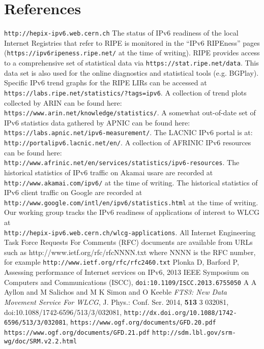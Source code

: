 \section*{References}

\begin{thebibliography}{1}
 {\tt http://hepix-ipv6.web.cern.ch}
 The status of IPv6 readiness of the local Internet Registries
that refer to RIPE is monitored in the ``IPv6 RIPEness'' pages ({\tt https://ipv6ripeness.ripe.net/} at the time of writing). 
 RIPE provides access to a comprehensive set of statistical
data via {\tt https://stat.ripe.net/data}. This data set is also used for
the online diagnostics and statistical tools (e.g. BGPlay). 
 Specific
IPv6 trend graphs for the RIPE LIRs can be accessed at\\ {\tt https://labs.ripe.net/statistics/?tags=ipv6}.
 A collection of trend plots collected by ARIN
can be found here:\\ {\tt https://www.arin.net/knowledge/statistics/}.
 A somewhat out-of-date set of IPv6
statistics data gathered by APNIC can be found here:\\ {\tt https://labs.apnic.net/ipv6-measurement/}.
 The LACNIC IPv6 portal is at:\\ {\tt http://portalipv6.lacnic.net/en/}.
 A collection of AFRINIC IPv6 resources can be found here:\\  {\tt http://www.afrinic.net/en/services/statistics/ipv6-resources}.
 The historical statistics of IPv6 traffic on Akamai usare are recorded at {\tt http://www.akamai.com/ipv6/} at the time of writing.
 The historical statistics of IPv6 client traffic on Google are recorded at\\ {\tt http://www.google.com/intl/en/ipv6/statistics.html} at the time of writing.
 Our working group tracks the IPv6 readiness of applications
of interest to WLCG at\\ {\tt http://hepix-ipv6.web.cern.ch/wlcg-applications}.
 All Internet Engineering Task Force Requests For Comments (RFC) documents are available
from URLs such as http://www.ietf.org/rfc/rfcNNNN.txt where NNNN is the RFC number, for example {\tt http://www.ietf.org/rfc/rfc2460.txt}
 Plonka D, Barford P, Assessing performance of Internet services on IPv6, 2013 IEEE Symposium on Computers and Communications (ISCC), {\tt doi:10.1109/ISCC.2013.6755050}
 {A A Ayllon and M Salichos and M K Simon and O Keeble} {\it {FTS}3: New Data Movement Service For {WLCG}}, {J. Phys.: Conf. Ser.} 2014, {\bf 513} 3 032081,  doi:{10.1088/1742-6596/513/3/032081}, {\tt{http://dx.doi.org/10.1088/1742-6596/513/3/032081}},
 {\tt https://www.ogf.org/documents/GFD.20.pdf} 
 {\tt https://www.ogf.org/documents/GFD.21.pdf} 
 {\tt http://sdm.lbl.gov/srm-wg/doc/SRM.v2.2.html}

\end{thebibliography}
